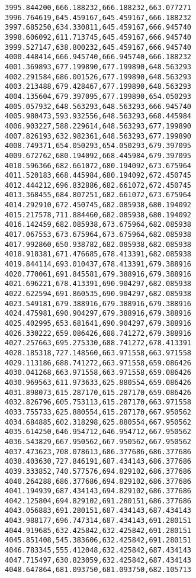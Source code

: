\documentclass[11pt]{article}
\begin{document}
\begin{Verbatim}[commandchars=\\\{\}]
3995.844200,666.188232,666.188232,663.077271
3996.764619,645.459167,645.459167,666.188232
3997.685250,634.330811,645.459167,666.945740
3998.606092,611.713745,645.459167,666.945740
3999.527147,638.800232,645.459167,666.945740
4000.448414,666.945740,666.945740,666.188232
4001.369893,677.199890,677.199890,648.563293
4002.291584,686.001526,677.199890,648.563293
4003.213488,679.428467,677.199890,648.563293
4004.135604,679.397095,677.199890,654.050293
4005.057932,648.563293,648.563293,666.945740
4005.980473,593.932556,648.563293,668.445984
4006.903227,588.229614,648.563293,677.199890
4007.826193,632.982361,648.563293,677.199890
4008.749371,654.050293,654.050293,679.397095
4009.672762,680.194092,668.445984,679.397095
4010.596366,682.661072,680.194092,673.675964
4011.520183,668.445984,680.194092,672.450745
4012.444212,696.832886,682.661072,672.450745
4013.368455,684.807251,682.661072,673.675964
4014.292910,672.450745,682.085938,680.194092
4015.217578,711.884460,682.085938,680.194092
4016.142459,682.085938,673.675964,682.085938
4017.067553,673.675964,673.675964,682.085938
4017.992860,650.938782,682.085938,682.085938
4018.918381,671.476685,678.413391,682.085938
4019.844114,693.010437,678.413391,679.388916
4020.770061,691.845581,679.388916,679.388916
4021.696221,678.413391,690.904297,682.085938
4022.622594,691.860535,690.904297,682.085938
4023.549181,679.388916,679.388916,679.388916
4024.475981,690.904297,679.388916,679.388916
4025.402995,653.681641,690.904297,679.388916
4026.330222,659.086426,688.741272,679.388916
4027.257663,695.275330,688.741272,678.413391
4028.185318,727.148560,663.971558,663.971558
4029.113186,688.741272,663.971558,659.086426
4030.041268,663.971558,663.971558,659.086426
4030.969563,611.973633,625.880554,659.086426
4031.898073,615.287170,615.287170,659.086426
4032.826796,605.753113,615.287170,663.971558
4033.755733,625.880554,615.287170,667.950562
4034.684885,602.318298,625.880554,667.950562
4035.614250,646.954712,646.954712,667.950562
4036.543829,667.950562,667.950562,667.950562
4037.473623,708.078613,686.377686,686.377686
4038.403630,727.846191,687.434143,686.377686
4039.333852,740.577576,694.829102,686.377686
4040.264288,686.377686,694.829102,686.377686
4041.194939,687.434143,694.829102,686.377686
4042.125804,694.829102,691.280151,686.377686
4043.056883,691.280151,687.434143,687.434143
4043.988177,696.747314,687.434143,691.280151
4044.919685,632.425842,632.425842,691.280151
4045.851408,545.383606,632.425842,691.280151
4046.783345,555.412048,632.425842,687.434143
4047.715497,630.823059,632.425842,687.434143
4048.647864,681.093750,681.093750,682.105713

\end{Verbatim}
\end{document}
